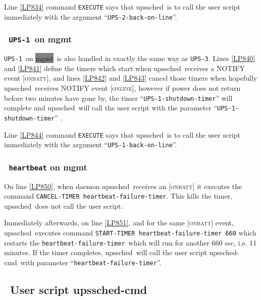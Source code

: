 \documentclass[12pt]{article}
\newlength{\headersep}\setlength{\headersep}{3mm}
\newcommand{\Hsep}{\hspace{\headersep}}
\newcommand{\newcolumn}{\vfill\eject}
\newcommand{\upssched}{\mbox{\textcolor{SCHEDCOLOUR}{upssched}}}
\newcommand{\upsschedcmd}{\mbox{\textcolor{CMDCOLOUR}{upssched-cmd}}}
\newcommand{\mgmt}[1][mgmt]{\colorbox{GRAY}{#1}}
\newcommand{\ONLINE}{\textcolor{MONCOLOUR}{\textsc{online}}}
\newcommand{\ONBATT}{\textcolor{MONCOLOUR}{\textsc{onbatt}}}
\newcommand{\NOTev}[1]{\textcolor{MONCOLOUR}{[{#1}]}}
\newcommand{\UPSi}{\texttt{UPS-1}}
\newcommand{\UPSii}{\texttt{UPS-2}}
\newcommand{\UPSiii}{\texttt{UPS-3}}
\newcommand{\UPSiionline}{\texttt{\UPSii{\allowbreak}-back{\allowbreak}-on{\allowbreak}-line}}
\newcommand{\UPSishutdown}{\texttt{\UPSi{\allowbreak}-shutdown{\allowbreak}-timer}}
\newcommand{\UPSionline}{\texttt{\UPSi{\allowbreak}-back{\allowbreak}-on{\allowbreak}-line}}
\newcommand{\heartfailtimer}{\texttt{heartbeat{\allowbreak}-failure{\allowbreak}-timer}}
\begin{document}
Line \ref{LP834} command \texttt{EXECUTE} says that \upssched\ is to call the
user script immediately with the argument ``\UPSiionline''.


\subsubsection{\Hsep\ \UPSi\ on mgmt}\label{UPSigold}

\UPSi\ on \mgmt\ is also handled in exactly the same way as \UPSiii.  Lines
\ref{LP840} and \ref{LP841} define the timers which start when
\upssched\ receives a NOTIFY event \NOTev{\ONBATT}, and lines \ref{LP842} and
\ref{LP843} cancel those timers when hopefully \upssched\ receives NOTIFY
event \NOTev{\ONLINE}, however if power does not return before two minutes
have gone by, the timer ``\UPSishutdown'' will complete and \upssched\ will
call the user script with the parameter ``\UPSishutdown'' .

Line \ref{LP844} command \texttt{EXECUTE} says that \upssched\ is to call the
user script immediately with the argument ``\UPSionline''.


\subsubsection{\Hsep\ \texttt{heartbeat} on mgmt}\label{heartbeatmgmt}

On line \ref{LP850}, when daemon \upssched\ receives an \NOTev{\ONBATT} it
executes the command \texttt{CANCEL{\allowbreak}-TIMER \heartfailtimer}.  This
kills the timer.  \upssched\ does not call the user script.

Immediately afterwards, on line \ref{LP851}, and for the same \NOTev{\ONBATT}
event, \upssched\ executes command \texttt{START{\allowbreak}-TIMER
  \heartfailtimer\ 660} which restarts the \heartfailtimer\ which will run for
another 660 sec, i.e. 11 minutes.  If the timer completes, \upssched\ will
call the user script \upsschedcmd\ with parameter ``\heartfailtimer''.

\subsection{\Hsep\ User script \upsschedcmd}\label{section:upsschedcmd.big}
\end{document}
